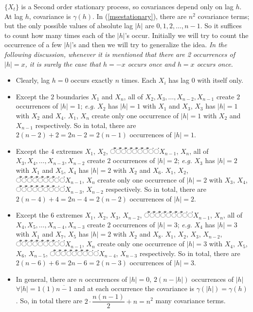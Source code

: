 \documentclass[11pt, a4paper]{article}
\numberwithin{equation}{section}
\theoremstyle{definition}
\begin{document}
$\{X_t\}$ is a Second order stationary process, so covariances depend only on lag $h$. At lag $h$, covariance is $\gamma(h)$. In (\ref{msestationary}), there are $n^2$ covariance terms; but the only possible values of absolute lag $|h|$ are $0, 1, 2, \ldots, n-1$. So it suffices to count how many times each of the $|h|$'s occur. Initially we will try to count the occurrence of a few $|h|$'s and then we will try to generalize the idea. \textit{In the following discussion, whenever it is mentioned that there are 2 occurrences of $|h| = x$, it is surely the case that $h = -x$ occurs once and $h = x$ occurs once.}

\begin{itemize}
\item Clearly, lag $h = 0$ occurs exactly $n$ times. Each $X_i$ has lag $0$ with itself only.
\item Except the $2$ boundaries $X_1$ and $X_n$, all of $X_2, X_3, \ldots, X_{n-2}, X_{n-1}$ create $2$ occurrences of $|h| = 1$; \textit{e.g.} $X_2$ has $|h| = 1$ with $X_1$ and $X_3$, $X_3$ has $|h| = 1$ with $X_2$ and $X_4$. $X_1$, $X_n$ create only one occurrence of $|h| = 1$ with $X_2$ and $X_{n-1}$ respectively. So in total, there are $2(n-2) + 2 = 2n - 2 = 2(n-1)$ occurrences of $|h| = 1$.
\item Except the $4$ extremes $X_1$, $X_2$, $ँँँँँँँंंX_{n-1}$, $X_n$, all of $X_3, X_4, \ldots, X_{n-3}, X_{n-2}$ create $2$ occurrences of $|h| = 2$; \textit{e.g.} $X_3$ has $|h| = 2$ with $X_1$ and $X_5$, $X_4$ has $|h| = 2$ with $X_2$ and $X_6$. $X_1$, $X_2$, $ँँँँँँँंंX_{n-1}$, $X_n$ create only one occurrence of $|h| = 2$ with $X_3$, $X_4$, $ँँँँँँँंंX_{n-3}$, $X_{n-2}$ respectively. So in total, there are $2(n-4) + 4 = 2n - 4 = 2(n - 2)$ occurrences of $|h| = 2$.
\item Except the $6$ extremes $X_1$, $X_2$, $X_3$, $X_{n-2}$, $ँँँँँँँंंX_{n-1}$, $X_n$, all of $X_4, X_5, \ldots, X_{n-4}, X_{n-3}$ create $2$ occurrences of $|h| = 3$; \textit{e.g.} $X_4$ has $|h| = 3$ with $X_1$ and $X_7$, $X_5$ has $|h| = 2$ with $X_2$ and $X_8$. $X_1$, $X_2$, $X_3$, $X_{n-2}$, $ँँँँँँँंंX_{n-1}$, $X_n$ create only one occurrence of $|h| = 3$ with $X_4$, $X_5$, $X_6$, $X_{n-5}$, $ँँँँँँँंंX_{n-4}$, $X_{n-3}$ respectively. So in total, there are $2(n-6) + 6 = 2n - 6 = 2(n - 3)$ occurrences of $|h| = 3$.
\item In general, there are $n$ occurrences of $|h| = 0$, $2(n - |h|)$ occurrences of $|h|$ $\forall |h| = 1(1)\overline{n-1}$ and at each occurrence the covariance is $\gamma(|h|) = \gamma(h)$. So, in total there are $2 \cdot \dfrac{n(n-1)}{2} + n = n^2$ many covariance terms.
\end{itemize}
\end{document}
